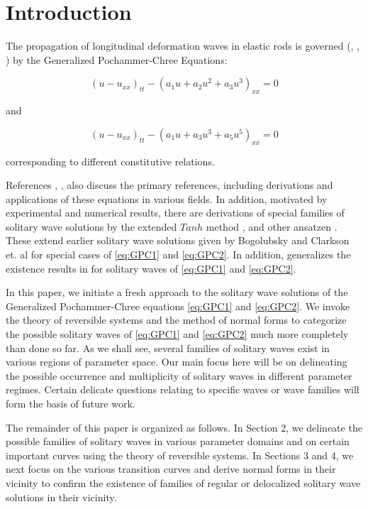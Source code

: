 \section{Introduction}

The propagation of longitudinal deformation waves in elastic rods is governed
(\cite{LCZ}, \cite{Runz}, \cite{WM}) by the Generalized Pochammer-Chree
Equations:

\begin{equation}\label{eq:GPC1}
\left( u - u_{xx} \right)_{tt} - \left( a_1 u + a_2 u^2 + a_3 u^3 \right)_{xx} =0  
\end{equation}

and

\begin{equation}  \label{eq:GPC2} 
\left( u - u_{xx} \right)_{tt} - \left( a_1 u + a_3 u^3 + a_5 u^5 \right)_{xx} =0
\end{equation}

corresponding to different constitutive relations.

References \cite{LCZ}, \cite{Runz}, \cite{WM} also discuss the primary
references, including derivations and applications of these equations in
various fields. In addition, motivated by experimental and numerical results,
there are derivations of special families of solitary wave solutions by the
extended $Tanh$ method \cite{LCZ}, and other ansatzen \cite{WM}. These extend
earlier solitary wave solutions given by Bogolubsky \cite{Bogo} and Clarkson
et. al \cite{CLVS} for special cases of \eqref{eq:GPC1} and \eqref{eq:GPC2}. In
addition, \cite{Runz} generalizes the existence results in \cite{Sax} for
solitary waves of \eqref{eq:GPC1} and \eqref{eq:GPC2}.  

In this paper, we initiate a fresh approach to the solitary wave solutions of
the Generalized Pochammer-Chree equations \eqref{eq:GPC1} and \eqref{eq:GPC2}.
We invoke the theory of reversible systems and the method of normal forms to
categorize the possible solitary waves of \eqref{eq:GPC1} and \eqref{eq:GPC2}
much more completely than done so far.  As we shall see, several families of
solitary waves exist in various regions of parameter space. Our main focus here
will be on delineating the possible occurrence and multiplicity of solitary
waves in different parameter regimes. Certain delicate questions relating to
specific waves or wave families will form the basis of future work. 

The remainder of this paper is organized as follows. In Section 2, we delineate
the possible families of solitary waves in various parameter domains and on
certain important curves using the theory of reversible systems. In Sections 3
and 4, we next focus on the various transition curves and derive normal forms
in their vicinity to confirm the existence of families of regular or
delocalized solitary wave solutions in their vicinity.

